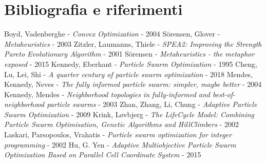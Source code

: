 \documentclass[12pt]{article}
\begin{document}
\section*{\hfil Bibliografia e riferimenti \hfil}
\renewcommand{\section}[2]{}
\begin{thebibliography}{1}

 Boyd, Vadenberghe - {\em Convex Optimization} - 2004
 Sörensen, Glover - {\em Metaheuristics} - 2003
 Zitzler, Laumanns, Thiele - {\em SPEA2: Improving the Strength Pareto Evolutionary Algorithm} - 2001
 Sörensen - {\em Metaheuristics - the metaphor exposed} - 2015
 Kennedy, Eberhant - {\em Particle Swarm Optimization} - 1995
 Cheng, Lu, Lei, Shi - {\em A quarter century of particle swarm optimization} - 2018
 Mendes, Kennedy, Neves - {\em The fully informed particle swarm: simpler, maybe better} - 2004
 Kennedy, Mendes - {\em Neighborhood topologies in fully-informed and best-of-neighborhood particle swarms} - 2003
 Zhan, Zhang, Li, Chung - {\em Adaptive Particle Swarm  Optimization} - 2009
 Krink, Løvbjerg - {\em The LifeCycle Model: Combining Particle Swarm Optimisation, Genetic Algorithms and HillClimbers} - 2002
 Laskari, Parsopoulos, Vrahatis - {\em Particle swarm optimization for integer programming} - 2002
 Hu, G. Yen - {\em Adaptive Multiobjective Particle Swarm Optimization Based on Parallel Cell Coordinate System} - 2015

\end{thebibliography}
\end{document}
